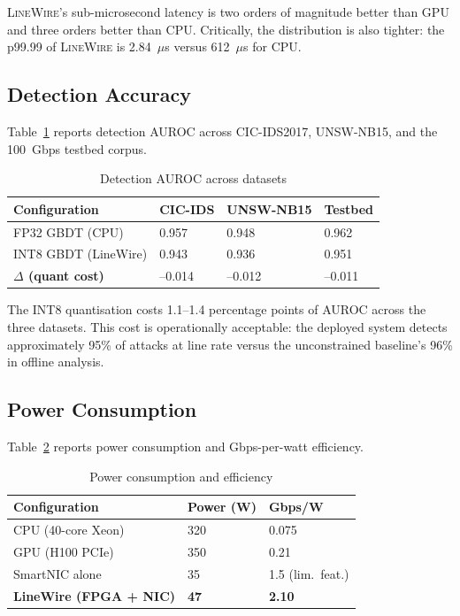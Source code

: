 \documentclass[sigconf,nonacm]{acmart}
\begin{document}
\textsc{LineWire}'s sub-microsecond latency is two orders of magnitude
better than GPU and three orders better than CPU. Critically, the
distribution is also tighter: the p99.99 of \textsc{LineWire} is 2.84~$\mu$s
versus 612~$\mu$s for CPU.

\subsection{Detection Accuracy}

Table~\ref{tab:accuracy} reports detection AUROC across CIC-IDS2017,
UNSW-NB15, and the 100~Gbps testbed corpus.

\begin{table}[h]
\caption{Detection AUROC across datasets}
\label{tab:accuracy}
\small
\begin{tabularx}{\columnwidth}{@{}p{2.4cm}X X X@{}}
\toprule
\textbf{Configuration} & \textbf{CIC-IDS} & \textbf{UNSW-NB15} & \textbf{Testbed} \\
\midrule
FP32 GBDT (CPU)         & 0.957 & 0.948 & 0.962 \\
INT8 GBDT (LineWire)    & 0.943 & 0.936 & 0.951 \\
\midrule
\textbf{$\Delta$ (quant cost)} & --0.014 & --0.012 & --0.011 \\
\bottomrule
\end{tabularx}
\end{table}

The INT8 quantisation costs 1.1--1.4 percentage points of AUROC
across the three datasets. This cost is operationally acceptable: the
deployed system detects approximately 95\% of attacks at line rate
versus the unconstrained baseline's 96\% in offline analysis.

\subsection{Power Consumption}

Table~\ref{tab:power} reports power consumption and Gbps-per-watt
efficiency.

\begin{table}[h]
\caption{Power consumption and efficiency}
\label{tab:power}
\small
\begin{tabularx}{\columnwidth}{@{}p{2.6cm}X X@{}}
\toprule
\textbf{Configuration} & \textbf{Power (W)} & \textbf{Gbps/W} \\
\midrule
CPU (40-core Xeon)   & 320 & 0.075 \\
GPU (H100 PCIe)      & 350 & 0.21  \\
SmartNIC alone       & 35  & 1.5 (lim.\ feat.) \\
\textbf{LineWire (FPGA + NIC)} & \textbf{47}  & \textbf{2.10} \\
\bottomrule
\end{tabularx}
\end{table}
\end{document}
